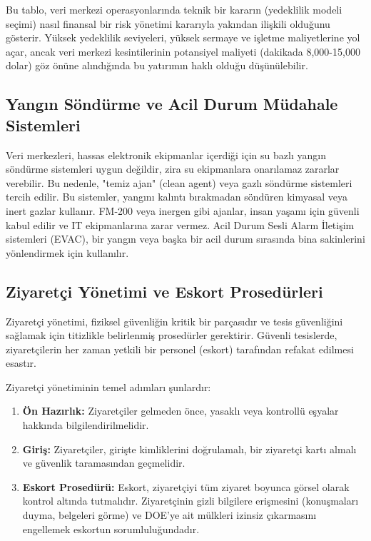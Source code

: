 Bu tablo, veri merkezi operasyonlarında teknik bir kararın (yedeklilik modeli seçimi) nasıl finansal bir risk yönetimi kararıyla yakından ilişkili olduğunu gösterir. Yüksek yedeklilik seviyeleri, yüksek sermaye ve işletme maliyetlerine yol açar, ancak veri merkezi kesintilerinin potansiyel maliyeti (dakikada 8,000-15,000 dolar) göz önüne alındığında bu yatırımın haklı olduğu düşünülebilir.

\subsection{Yangın Söndürme ve Acil Durum Müdahale Sistemleri}

Veri merkezleri, hassas elektronik ekipmanlar içerdiği için su bazlı yangın söndürme sistemleri uygun değildir, zira su ekipmanlara onarılamaz zararlar verebilir. Bu nedenle, "temiz ajan" (clean agent) veya gazlı söndürme sistemleri tercih edilir. Bu sistemler, yangını kalıntı bırakmadan söndüren kimyasal veya inert gazlar kullanır. FM-200 veya inergen gibi ajanlar, insan yaşamı için güvenli kabul edilir ve IT ekipmanlarına zarar vermez. Acil Durum Sesli Alarm İletişim sistemleri (EVAC), bir yangın veya başka bir acil durum sırasında bina sakinlerini yönlendirmek için kullanılır.

\subsection{Ziyaretçi Yönetimi ve Eskort Prosedürleri}

Ziyaretçi yönetimi, fiziksel güvenliğin kritik bir parçasıdır ve tesis güvenliğini sağlamak için titizlikle belirlenmiş prosedürler gerektirir. Güvenli tesislerde, ziyaretçilerin her zaman yetkili bir personel (eskort) tarafından refakat edilmesi esastır.

Ziyaretçi yönetiminin temel adımları şunlardır:
\begin{enumerate}
    \item \textbf{Ön Hazırlık:} Ziyaretçiler gelmeden önce, yasaklı veya kontrollü eşyalar hakkında bilgilendirilmelidir.
    \item \textbf{Giriş:} Ziyaretçiler, girişte kimliklerini doğrulamalı, bir ziyaretçi kartı almalı ve güvenlik taramasından geçmelidir.
    \item \textbf{Eskort Prosedürü:} Eskort, ziyaretçiyi tüm ziyaret boyunca görsel olarak kontrol altında tutmalıdır. Ziyaretçinin gizli bilgilere erişmesini (konuşmaları duyma, belgeleri görme) ve DOE'ye ait mülkleri izinsiz çıkarmasını engellemek eskortun sorumluluğundadır.
\end{enumerate}

